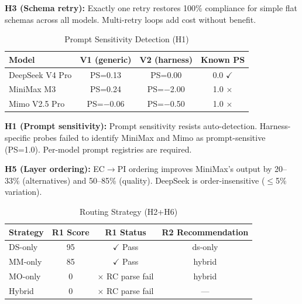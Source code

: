 \documentclass[11pt,a4paper]{article}
\begin{document}
\textbf{H3 (Schema retry):} Exactly one retry restores 100\% compliance for simple flat schemas across all models. Multi-retry loops add cost without benefit.

\begin{table}[htbp]\centering\caption{Prompt Sensitivity Detection (H1)}\small
\begin{tabular}{lccc}\toprule\textbf{Model} & \textbf{V1 (generic)} & \textbf{V2 (harness)} & \textbf{Known PS}\\\midrule
DeepSeek V4 Pro & PS=0.13 & PS=0.00 & 0.0 $\checkmark$\\
MiniMax M3 & PS=0.24 & PS=$-$2.00 & 1.0 $\times$\\
Mimo V2.5 Pro & PS=$-$0.06 & PS=$-$0.50 & 1.0 $\times$\\\bottomrule
\end{tabular}
\end{table}

\textbf{H1 (Prompt sensitivity):} Prompt sensitivity resists auto-detection. Harness-specific probes failed to identify MiniMax and Mimo as prompt-sensitive (PS=1.0). Per-model prompt registries are required.

\begin{table}[htbp]\centering\caption{Layer Ordering Effect (H5)}\small
{}
\end{table}

\textbf{H5 (Layer ordering):} EC$\rightarrow$PI ordering improves MiniMax's output by 20--33\% (alternatives) and 50--85\% (quality). DeepSeek is order-insensitive ($\leq$5\% variation).

\begin{table}[htbp]\centering\caption{Routing Strategy (H2+H6)}\label{tab:routing}\small
\begin{tabular}{lccc}\toprule\textbf{Strategy} & \textbf{R1 Score} & \textbf{R1 Status} & \textbf{R2 Recommendation}\\\midrule
DS-only & 95 & $\checkmark$ Pass & ds-only\\
MM-only & 85 & $\checkmark$ Pass & hybrid\\
MO-only & 0 & $\times$ RC parse fail & hybrid\\
Hybrid & 0 & $\times$ RC parse fail & ---\\\bottomrule
\end{tabular}
\end{table}
\end{document}
